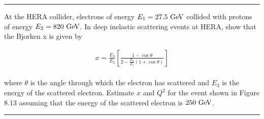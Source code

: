 \noindent\rule{7in}{1.5pt}


\begin{problem}{8.8}
At the HERA collider, electrons of energy $E_1 = 27.5 \text{ GeV}$ collided with protons of energy $E_2 = 820 \text{ GeV}$. In deep inelastic scattering events at HERA, show that the Bjorken x is given by

\begin{align*}
    x = \frac{E_3}{E_2} \left[ \frac{1-\cos\theta}{2-\frac{E_3}{E_1}\left(1+\cos\theta\right)} \right]
\end{align*}\\
where $\theta$ is the angle through which the electron has scattered and $E_3$ is the energy of the scattered electron. Estimate $x$ and $Q^2$ for the event shown in Figure 8.13 assuming that the energy of the scattered electron is $250 \text{ GeV}$.
\end{problem}
\begin{solution}

\end{solution}

\noindent\rule{7in}{1.5pt}

